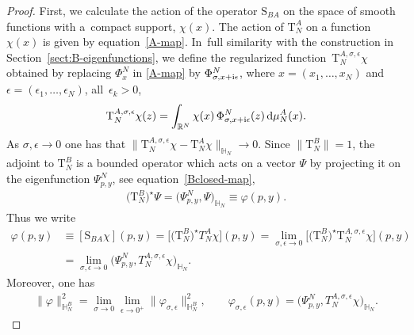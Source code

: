 \documentclass[pdftex]{sigma}%
\numberwithin{equation}{section}
\begin{document}
\begin{proof}
First, we calculate the action of the operator $\mathrm S_{BA}$ on the space of smooth functions with a~com\-pact support, $\chi(x)$. The
action of $\mathrm T_N^A$ on a function $\chi(x)$ is given by equation~\eqref{A-map}. In~full similarity with the construction in
Section~\ref{sect:B-eigenfunctions}, we define the regularized function~$\mathrm T_N^{A,\sigma,\epsilon}\chi$ obtained by replacing
$\Phi^N_{x}$ in \eqref{A-map} by $\Phi^N_{\sigma,x+{\rm i}\epsilon}$, where $x=(x_1,\dots,x_N)$ and $\epsilon=(\epsilon_1,\dots,\epsilon_N)$,
all~$\epsilon_k>0$,
\begin{gather}\label{A-map-reg}
\mathrm T_N^{A,\sigma,\epsilon}\chi(z)=\int_{\mathbb R^{N}} \chi( x)\, \Phi^N_{{\sigma,x+{\rm i}\epsilon}}( z)\, {\rm d}\mu_{N}^{A}( x).
\end{gather}
As $\sigma,\epsilon\to 0$ one has that $\big\|\mathrm T_N^{A,\sigma,\epsilon}\chi - \mathrm T_N^{A}\chi \big\|_{\mathbb H_N} \to 0$.
Since $\|\mathrm T_N^B\|=1$, the adjoint to $\mathrm T_N^B$ is a bounded operator which acts on a vector $\Psi$ by projecting it on the
eigenfunction $\Psi^N_{p,y}$, see equation~\eqref{Bclosed-map},
\begin{gather*}
\big(\mathrm T_N^B\big)^\star \Psi =\big(\Psi^N_{p,y},\Psi\big)_{\mathbb H_N} \equiv \varphi(p,y).
\end{gather*}
Thus we write
\begin{align*}
\varphi(p,y)&\equiv [\mathrm S_{BA}\chi](p,y)= \big[ \big(\mathrm T_N^B\big)^\star T_N^{A}\chi \big](p,y)
=\lim_{\sigma,\epsilon\to 0} \big[ \big(\mathrm T_N^B\big)^\star \mathrm T_N^{A,\sigma,\epsilon}\chi \big](p,y)
\\
& =\lim_{\sigma,\epsilon\to 0}\big( \Psi^N_{p,y} , T_N^{A,\sigma,\epsilon}\chi \big)_{\mathbb H_N}.
\end{align*}
Moreover, one has
\begin{gather}\label{varphi-def-and-norm}
\|\varphi\|^2_{\mathbb H_N^{B}}=\lim_{\sigma\to 0}\lim_{\epsilon\to0^+}\|\varphi_{\sigma,\epsilon}\|^2_{\mathbb H_N^{B}}, \qquad
\varphi_{\sigma,\epsilon}(p,y) = \big( \Psi^N_{p,y},T_N^{A,\sigma,\epsilon}\chi \big)_{\mathbb H_N}.
\end{gather}


\end{proof}
\end{document}
